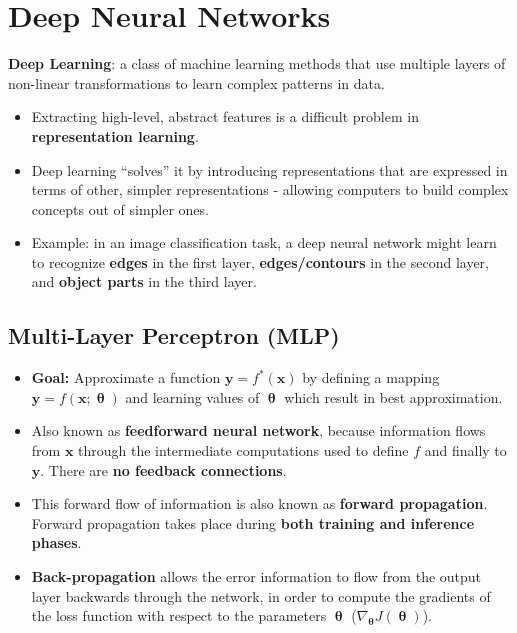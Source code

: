 \section*{Deep Neural Networks}

\textbf{Deep Learning}: a class of machine learning methods that use multiple layers of non-linear transformations to learn complex patterns in data.

\begin{itemize}
  \item Extracting high-level, abstract features is a difficult problem in \textbf{representation learning}.
  \item Deep learning  \enquote{solves} it by introducing representations that are expressed in terms of other, simpler representations - allowing computers to build complex concepts out of simpler ones.
  \item Example: in an image classification task, a deep neural network might learn to recognize \textbf{edges} in the first layer, \textbf{edges/contours} in the second layer, and \textbf{object parts} in the third layer.
\end{itemize}

\subsection*{Multi-Layer Perceptron (MLP)}

\begin{itemize}
  \item \textbf{Goal:} Approximate a function $\mathbf{y} = f^*(\mathbf{x})$ by defining a mapping $\mathbf{y} = f(\mathbf{x}; \boldsymbol{\uptheta})$ and learning values of $\boldsymbol{\uptheta}$ which result in best approximation.
  \item Also known as \textbf{feedforward neural network}, because information flows from $\mathbf{x}$ through the intermediate computations used to define $f$ and finally to $\mathbf{y}$. There are \textbf{no feedback connections}.
  \item This forward flow of information is also known as \textbf{forward propagation}. Forward propagation takes place during \textbf{both training and inference phases}.
  \item \textbf{Back-propagation} allows the error information to flow from the output layer backwards through the network, in order to compute the gradients of the loss function with respect to the parameters $\boldsymbol{\uptheta}$ ($\nabla_{\boldsymbol{\uptheta}} J (\boldsymbol{\uptheta})$).
\end{itemize}

